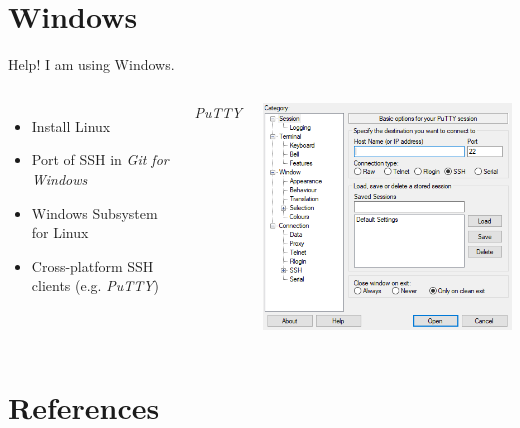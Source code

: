 \documentclass[10pt, graphics, aspectratio=169, table]{beamer}
\begin{document}
\section{Windows}
\begin{frame}[fragile]{Help! I am using Windows.}
	\begin{columns}
		\begin{itemize}
			\item Install Linux
			\item Port of SSH in \textit{Git for Windows}
			\item Windows Subsystem for Linux
			\item Cross-platform SSH clients (e.g. \textit{PuTTY})
		\end{itemize}
		\centering
		\emph{PuTTY} \cite{putty}

		\includegraphics[height=0.65\paperheight]{img/putty.png}
	\end{columns}
\end{frame}

\section{References}
\begin{frame}[allowframebreaks]
	\printbibliography[heading=none]
\end{frame}
\end{document}
